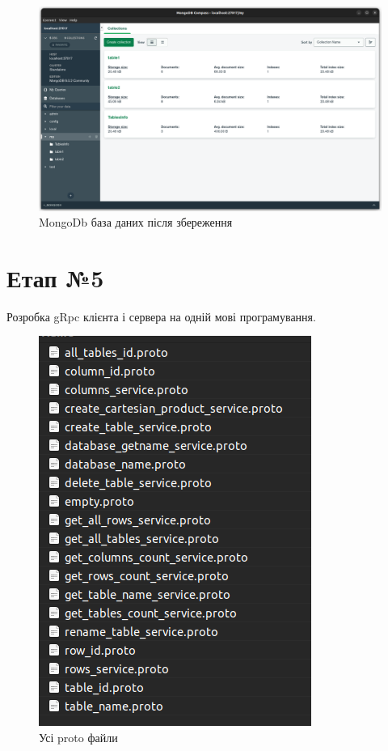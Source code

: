 \documentclass[a4paper, 12pt]{article}
\begin{document}
\begin{figure}[H]
\centering
\includegraphics[scale=0.3]{resources/MongoDb.png}
\caption{MongoDb база даних після збереження}
\end{figure} 

\section{Етап №5}

Розробка gRpc клієнта і сервера на одній мові програмування.

\begin{figure}[H]
\centering
\includegraphics[scale=0.3]{resources/ProtoFiles.png}
\caption{Усі proto файли}
\end{figure}
\end{document}
